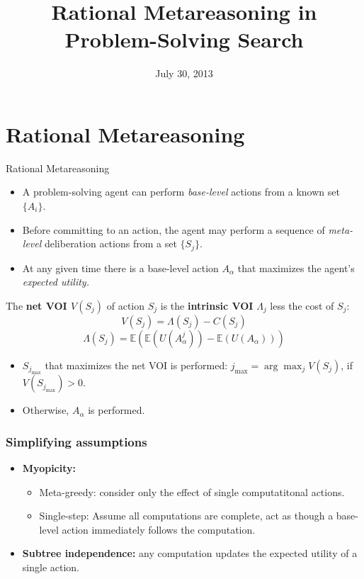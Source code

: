 \documentclass{beamer}
\title{Rational Metareasoning in Problem-Solving Search}
\date{July 30, 2013}
\begin{document}
\begin{frame}
\titlepage
\end{frame}

\begin{frame}
\tableofcontents
\end{frame}

\section{Rational Metareasoning}

\begin{frame}{Rational Metareasoning}
\begin{itemize}
\item A problem-solving agent can perform {\it base-level} actions from a known
          set $\{A_i\}$.
\item Before committing to an action, the agent may perform a sequence of
          {\it meta-level} deliberation actions from a set $\{S_j\}$.
\item At any given time there is a base-level action $A_\alpha$ that maximizes
          the agent's {\it expected utility.}
\end{itemize}

          The {\bf net VOI $V(S_j)$} of action $S_j$ is the {\bf intrinsic VOI} $\Lambda_j$ less the cost of $S_j$:
          \[V(S_j)=\Lambda(S_j)-C(S_j)\]
           \[\Lambda(S_j)=\mathbb{E}\left(\mathbb{E}(U(A_\alpha^j))-\mathbb{E}(U(A_\alpha))\right)\]

\begin{itemize} 
\item  $S_{j_{\max}}$ that maximizes the net VOI  is performed: $j_{\max} = \arg\max_jV(S_j)$, if $V(S_{j_{\max}})>0$.
\item Otherwise, $A_\alpha$ is performed.
\end{itemize}
\end{frame}

\begin{frame}
\frametitle{Simplifying assumptions}
\begin{itemize}
\item {\bf Myopicity:}
  \begin{itemize}
  \item Meta-greedy: consider only the effect of single computatitonal actions.
  \item Single-step: Assume all computations are complete, act as
    though a base-level action immediately follows the computation.
  \end{itemize}
\item {\bf Subtree independence:} any computation updates the expected
  utility of a single action.
\end{itemize}
\end{frame}
  
\end{document}

